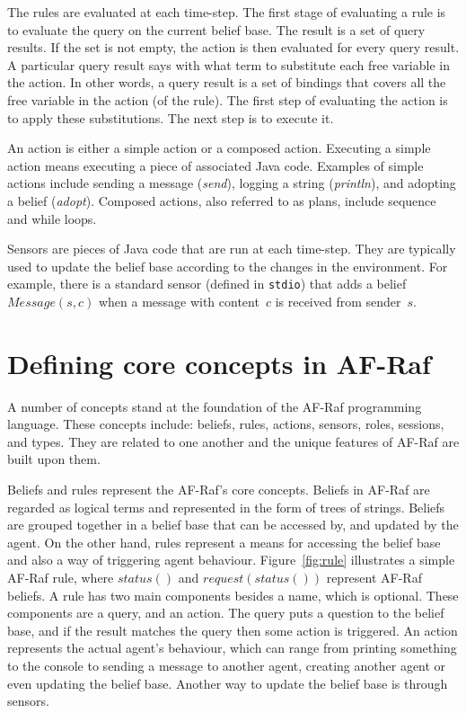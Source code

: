 \documentclass[a4paper,12pt,oneside,fleqn]{book} %
\theoremstyle{plain}
\theoremstyle{definition}
\theoremstyle{remark}
\newcommand{\rg}[1]{\marginpar{\tiny\raggedright\textcolor{blue}{\bf rg:} #1}}
\begin{document}
The rules are evaluated at each time-step. The first stage of evaluating a
rule is to evaluate the query on the current belief base. The result is a
set of query results. \rg{A result is a set of results? Empty set is
special?} If the set is not empty, the action is then evaluated for every
query result. A particular query result says with what term to substitute
each free variable in the action. In other words, a query result is a set
of bindings that covers all the free variable in the action (of the rule).
The first step of evaluating the action is to apply these substitutions.
The next step is to execute it.

An action is either a simple action or a composed action. Executing a
simple action means executing a piece of associated Java code. Examples of
simple actions include sending a message (\textit{send}), logging a string
(\textit{println}), and adopting a belief (\textit{adopt}).  Composed
actions, also referred to as plans, include sequence and while loops.

Sensors are pieces of Java code that are run at each time-step. They are
typically used to update the belief base according to the changes in the
environment. For example, there is a standard sensor (defined in
\texttt{stdio}) that adds a belief $\mathit{Message}(s,c)$ when a message
with content~$c$ is received from sender~$s$. %
\section{Defining core concepts in AF-Raf} %

A number of concepts stand at the foundation of the AF-Raf programming
language. These concepts include: beliefs, rules, actions, sensors, roles,
sessions, and types. They are related to one another and the unique
features of AF-Raf are built upon them. 

Beliefs and rules represent the AF-Raf's core concepts. Beliefs in AF-Raf
are regarded as logical terms and represented in the form of trees of
strings. Beliefs are grouped together in a belief base that can be accessed
by, and updated by the agent. On the other hand, rules represent a means
for accessing the belief base and also a way of triggering agent behaviour.
Figure~\ref{fig:rule} illustrates a simple AF-Raf rule, where $status()$ and
$request(status())$ represent AF-Raf beliefs. A rule has
two main components besides a name, which is optional. These components are
a query, and an action. The query puts a question to the belief base, and
if the result matches the query then some action is triggered.  An action
represents the actual agent's behaviour, which can range from printing
something to the console to sending a message to another agent, creating
another agent or even updating the belief base.  Another way to update the
belief base is through sensors.
\end{document}
